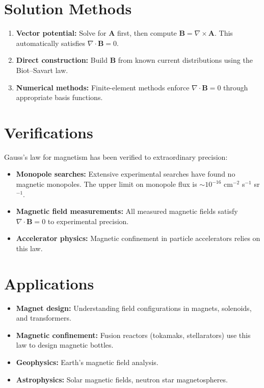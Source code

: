 \section*{Solution Methods}

\begin{enumerate}
\item \textbf{Vector potential:} Solve for $\mathbf{A}$ first, then compute $\mathbf{B} = \nabla \times \mathbf{A}$. This automatically satisfies $\nabla \cdot \mathbf{B} = 0$.
\item \textbf{Direct construction:} Build $\mathbf{B}$ from known current distributions using the Biot--Savart law.
\item \textbf{Numerical methods:} Finite-element methods enforce $\nabla \cdot \mathbf{B} = 0$ through appropriate basis functions.
\end{enumerate}

\section*{Verifications}

Gauss's law for magnetism has been verified to extraordinary precision:

\begin{itemize}
\item \textbf{Monopole searches:} Extensive experimental searches have found no magnetic monopoles. The upper limit on monopole flux is $\sim 10^{-16}$ cm$^{-2}$ s$^{-1}$ sr$^{-1}$.
\item \textbf{Magnetic field measurements:} All measured magnetic fields satisfy $\nabla \cdot \mathbf{B} = 0$ to experimental precision.
\item \textbf{Accelerator physics:} Magnetic confinement in particle accelerators relies on this law.
\end{itemize}

\section*{Applications}

\begin{itemize}
\item \textbf{Magnet design:} Understanding field configurations in magnets, solenoids, and transformers.
\item \textbf{Magnetic confinement:} Fusion reactors (tokamaks, stellarators) use this law to design magnetic bottles.
\item \textbf{Geophysics:} Earth's magnetic field analysis.
\item \textbf{Astrophysics:} Solar magnetic fields, neutron star magnetospheres.
\end{itemize}

